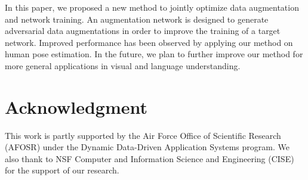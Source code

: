\documentclass[10pt,twocolumn,letterpaper]{article}
\begin{document}
In this paper, we proposed a new method to jointly optimize data augmentation and network training. An augmentation network is designed to generate adversarial data augmentations in order to improve the training of a target network. Improved performance has been observed by applying our method on human pose estimation. In the future, we plan to further improve our method for more general applications in visual and language understanding.  


\section{Acknowledgment}
This work is partly supported by the Air Force Office of Scientific Research (AFOSR) under the Dynamic Data-Driven Application Systems program. We also thank to NSF Computer and Information Science and Engineering (CISE) for the support of our research.

{\small


}
\end{document}
